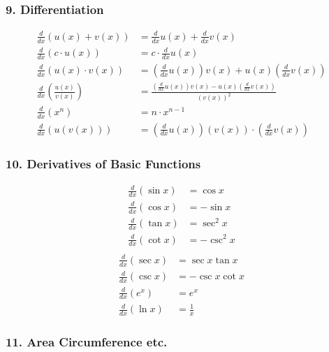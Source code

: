 \documentclass[twocolumn,a4]{article}
\begin{document}
\subsubsection*{9. Differentiation}
\begin{align*}
\frac{d}{dx}(u(x)+v(x)) &= \frac{d}{dx}u(x) + \frac{d}{dx}v(x) \\
\frac{d}{dx}(c \cdot u(x)) &= c \cdot \frac{d}{dx}u(x) \\
\frac{d}{dx}(u(x) \cdot v(x)) &= \left(\frac{d}{dx}u(x)\right)v(x) + u(x)\left(\frac{d}{dx}v(x)\right) \\
\frac{d}{dx}\left(\frac{u(x)}{v(x)}\right) &= \frac{\left(\frac{d}{dx}u(x)\right)v(x) - u(x)\left(\frac{d}{dx}v(x)\right)}{(v(x))^2} \\
\frac{d}{dx}(x^n) &= n \cdot x^{n-1} \\
\frac{d}{dx}(u(v(x))) &= \left(\frac{d}{dx}u(x)\right)(v(x)) \cdot \left(\frac{d}{dx}v(x)\right)
\end{align*}

\subsubsection*{10. Derivatives of Basic Functions}

\begin{multicols}{2}
\begin{align*}
\frac{d}{dx}(\sin x) &= \cos x \\
\frac{d}{dx}(\cos x) &= -\sin x \\
\frac{d}{dx}(\tan x) &= \sec^2 x \\
\frac{d}{dx}(\cot x) &= -\csc^2 x \\
\end{align*}
\columnbreak
\begin{align*}
\frac{d}{dx}(\sec x) &= \sec x \tan x \\
\frac{d}{dx}(\csc x) &= -\csc x \cot x \\
\frac{d}{dx}(e^x) &= e^x \\
\frac{d}{dx}(\ln x) &= \frac{1}{x}
\end{align*}
\end{multicols}

\subsubsection*{11. Area Circumference etc.}
\end{document}
